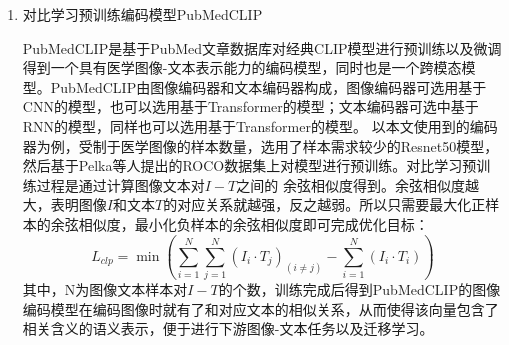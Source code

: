 \begin{enumerate}[topsep = 0 pt, itemsep= 0 pt, parsep=0pt, partopsep=0pt, leftmargin=44pt, itemindent=0pt, labelsep=6pt, label=(\arabic*)]
	\item 对比学习预训练编码模型PubMedCLIP
	
	PubMedCLIP是基于PubMed文章数据库对经典CLIP模型进行预训练以及微调得到一个具有医学图像-文本表示能力的编码模型，同时也是一个跨模态模型。PubMedCLIP由图像编码器和文本编码器构成，图像编码器可选用基于CNN的模型，也可以选用基于Transformer的模型；文本编码器可选中基于RNN的模型，同样也可以选用基于Transformer的模型。
	以本文使用到的编码器为例，受制于医学图像的样本数量，选用了样本需求较少的Resnet50模型，然后基于Pelka等人提出的ROCO数据集上对模型进行预训练。对比学习预训练过程是通过计算图像文本对$I-T$之间的
	余弦相似度得到。余弦相似度越大，表明图像$I$和文本$T$的对应关系就越强，反之越弱。所以只需要最大化正样本的余弦相似度，最小化负样本的余弦相似度即可完成优化目标：
	\begin{equation}
		\label{}
		L_{clp}=\min \left(\sum_{i=1}^N \sum_{j=1}^N\left(I_i \cdot T_j\right)_{(i \neq j)}-\sum_{i=1}^N\left(I_i \cdot T_i\right)\right)
	\end{equation}
	其中，N为图像文本样本对$I-T$的个数，训练完成后得到PubMedCLIP的图像编码模型在编码图像时就有了和对应文本的相似关系，从而使得该向量包含了相关含义的语义表示，便于进行下游图像-文本任务以及迁移学习。
\end{enumerate}

